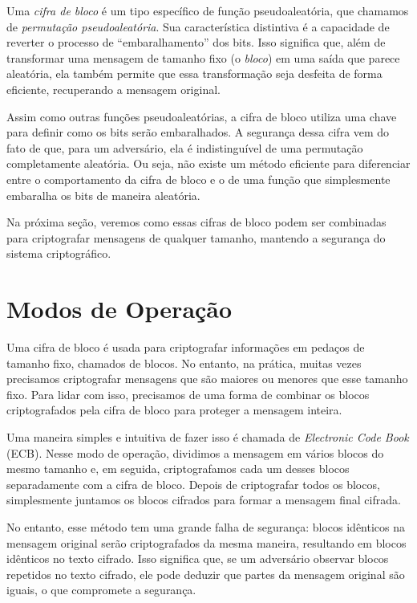 Uma {\em cifra de bloco} é um tipo específico de função pseudoaleatória, que chamamos de {\em permutação pseudoaleatória}.
Sua característica distintiva é a capacidade de reverter o processo de ``embaralhamento'' dos bits.
Isso significa que, além de transformar uma mensagem de tamanho fixo (o {\em bloco}) em uma saída que parece aleatória, ela também permite que essa transformação seja desfeita de forma eficiente, recuperando a mensagem original.

Assim como outras funções pseudoaleatórias, a cifra de bloco utiliza uma chave para definir como os bits serão embaralhados.
A segurança dessa cifra vem do fato de que, para um adversário, ela é indistinguível de uma permutação completamente aleatória.
Ou seja, não existe um método eficiente para diferenciar entre o comportamento da cifra de bloco e o de uma função que simplesmente embaralha os bits de maneira aleatória.

Na próxima seção, veremos como essas cifras de bloco podem ser combinadas para criptografar mensagens de qualquer tamanho, mantendo a segurança do sistema criptográfico.

\section{Modos de Operação}
\label{sec:modos-de-operacao-bloco}

Uma cifra de bloco é usada para criptografar informações em pedaços de tamanho fixo, chamados de blocos.
No entanto, na prática, muitas vezes precisamos criptografar mensagens que são maiores ou menores que esse tamanho fixo.
Para lidar com isso, precisamos de uma forma de combinar os blocos criptografados pela cifra de bloco para proteger a mensagem inteira.

Uma maneira simples e intuitiva de fazer isso é chamada de {\em Electronic Code Book} (ECB).
Nesse modo de operação, dividimos a mensagem em vários blocos do mesmo tamanho e, em seguida, criptografamos cada um desses blocos separadamente com a cifra de bloco.
Depois de criptografar todos os blocos, simplesmente juntamos os blocos cifrados para formar a mensagem final cifrada.

No entanto, esse método tem uma grande falha de segurança:
blocos idênticos na mensagem original serão criptografados da mesma maneira, resultando em blocos idênticos no texto cifrado.
Isso significa que, se um adversário observar blocos repetidos no texto cifrado, ele pode deduzir que partes da mensagem original são iguais, o que compromete a segurança.

